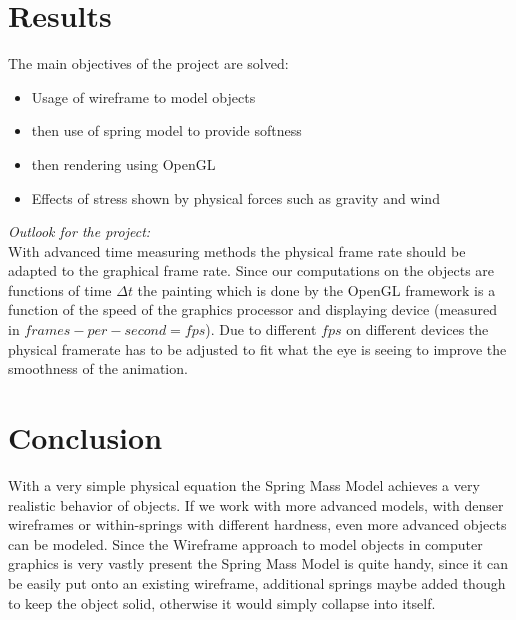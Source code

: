 \documentclass[11pt]{article}
\begin{document}
\section{Results}
The main objectives of the project are solved:
\begin{itemize}
\item{Usage of wireframe to model objects}
\item{then use of spring model to provide softness}
\item{then rendering using OpenGL}
\item{Effects of stress shown by physical forces such as gravity and wind}
\end{itemize}

\textit{Outlook for the project:}\\
With advanced time measuring methods the physical frame rate should be adapted to the graphical frame rate. Since our computations on the objects are functions of time $\Delta t$ the painting which is done by the OpenGL framework is a function of the speed of the graphics processor and displaying device (measured in $frames-per-second=fps$). Due to different $fps$ on different devices the physical framerate has to be adjusted to fit what the eye is seeing to improve the smoothness of the animation.\\[1em]
%

\section{Conclusion}
With a very simple physical equation the Spring Mass Model achieves a very realistic behavior of objects. If we work with more advanced models, with denser wireframes or within-springs with different hardness, even more advanced objects can be modeled. Since the Wireframe approach to model objects in computer graphics is very vastly present the Spring Mass Model is quite handy, since it can be easily put onto an existing wireframe, additional springs maybe added though to keep the object solid, otherwise it would simply collapse into itself.
%


%
%
\newpage
\nocite{hill}
\nocite{rogersadams}
\nocite{dam}
\nocite{PBDM}
\nocite{baker}
\nocite{bakerGL}
\nocite{IASDO}
\nocite{LSCS}
\nocite{DCMSM}
\nocite{gama}
\nocite{wiki}
\nocite{hair}
\nocite{pyGL}



%
%
\end{document}
